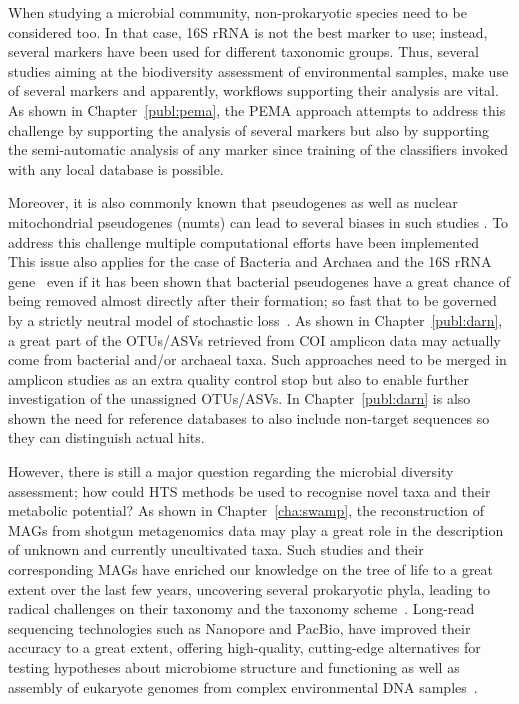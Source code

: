    When studying a microbial community, non-prokaryotic species need to be considered too. 
   In that case, 16S rRNA is not the best marker to use; instead, several markers 
   have been used for different taxonomic groups. 
   Thus, several studies aiming at the biodiversity assessment of environmental samples, 
   make use of several markers and apparently, workflows supporting their analysis are vital. 
   As shown in Chapter~\ref{publ:pema}, the PEMA approach attempts to address this challenge 
   by supporting the analysis of several markers but also by
   supporting the semi-automatic analysis of any marker since training of the classifiers invoked
   with any local database is possible. 

   Moreover, it is also commonly known that pseudogenes as well as 
   nuclear mitochondrial pseudogenes (numts) can lead to several biases in such studies \citep{song2008many}.
   To address this challenge multiple computational efforts have been implemented~\citep{porter2021profile}
   This issue also applies for the case of Bacteria and Archaea and the 16S rRNA gene~\citep{pei2010diversity}
   even if it has been shown that bacterial pseudogenes have a great chance of being removed almost directly after their formation;
   so fast that to be governed by a strictly neutral model of stochastic loss~\citep{kuo2010extinction}.
   As shown in Chapter~\ref{publ:darn}, a great part of the OTUs/ASVs retrieved from COI amplicon data
   may actually come from bacterial and/or archaeal taxa.
   Such approaches need to be merged in amplicon studies as an extra
   quality control stop but also to enable further investigation of the unassigned OTUs/ASVs. 
   In Chapter~\ref{publ:darn} is also shown the need for reference databases to also include non-target sequences 
   so they can distinguish actual hits. 

   However, there is still a major question regarding the microbial diversity assessment; 
   how could HTS methods be used to recognise novel taxa and their metabolic potential? 
   As shown in Chapter~\ref{cha:swamp}, the reconstruction of MAGs from shotgun metagenomics data
   may play a great role in the description of unknown and currently uncultivated taxa. 
   Such studies and their corresponding MAGs have enriched our knowledge on the tree of life to a great extent 
   over the last few years, uncovering several prokaryotic phyla, leading to 
   radical challenges on their taxonomy and the taxonomy scheme~\citep{parks_gtdb_2022}.
   Long-read sequencing technologies such as Nanopore and PacBio, have improved their accuracy to a great extent,
   offering high-quality, cutting-edge alternatives for testing hypotheses about microbiome structure 
   and functioning as well as assembly of eukaryote genomes from complex environmental DNA samples~\citep{tedersoo2021perspectives}.

